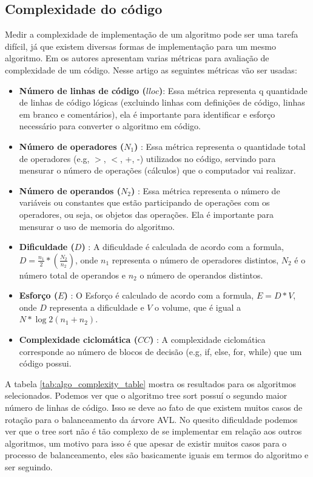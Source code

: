 \documentclass[12pt]{article}
\begin{document}
\subsection{Complexidade do código}

Medir a complexidade de implementação de um algoritmo pode ser uma tarefa difícil, já que existem diversas formas de implementação para um mesmo algoritmo. Em \cite{yu2010survey} os autores apresentam varias métricas para avaliação de complexidade de um código. Nesse artigo as seguintes métricas vão ser usadas:

\begin{itemize}
  \item \textbf{Número de linhas de código ($lloc$)}: Essa métrica representa q quantidade de linhas de código lógicas (excluindo linhas com definições de código, linhas em branco e comentários), ela é importante para identificar e esforço necessário para converter o algoritmo em código. 
  \item \textbf{Número de operadores ($N_1$)} : Essa métrica representa o quantidade total de operadores (e.g, $>$, $<$, +, -) utilizados no código, servindo para mensurar o número de operações (cálculos) que o computador vai realizar.
  \item \textbf{Número de operandos ($N_2$)} : Essa métrica representa o número de variáveis ou constantes que estão participando de operações com os operadores, ou seja, os objetos das operações. Ela é importante para mensurar o uso de memoria do algoritmo.
  \item \textbf{Dificuldade ($D$)} : A dificuldade é calculada de acordo com a formula, $D = \frac{n_1}{2} * (\frac{N_2}{n_2})$, onde $n_1$ representa o número de operadores distintos, $N_2$ é o número total de operandos e $n_2$ o número de operandos distintos.
  \item \textbf{Esforço ($E$)} : O Esforço é calculado de acordo com a formula, $E = D * V$, onde $D$ representa a dificuldade e $V$ o volume, que é igual a $N * \log2(n_1 + n_2)$.
  \item \textbf{Complexidade ciclomática ($CC$)} : A complexidade ciclomática corresponde ao número de blocos de decisão (e.g, if, else, for, while) que um código possui.
\end{itemize}

A tabela \ref{tab:algo_complexity_table} mostra os resultados para os algoritmos selecionados. Podemos ver que o algoritmo tree sort possuí o segundo maior número de linhas de código. Isso se deve ao fato de que existem muitos casos de rotação para o balanceamento da árvore AVL. No quesito dificuldade podemos ver que o tree sort não é tão complexo de se implementar em relação aos outros algoritmos, um motivo para isso é que apesar de existir muitos casos para o processo de balanceamento, eles são basicamente iguais em termos do algoritmo e ser seguindo.
\end{document}
